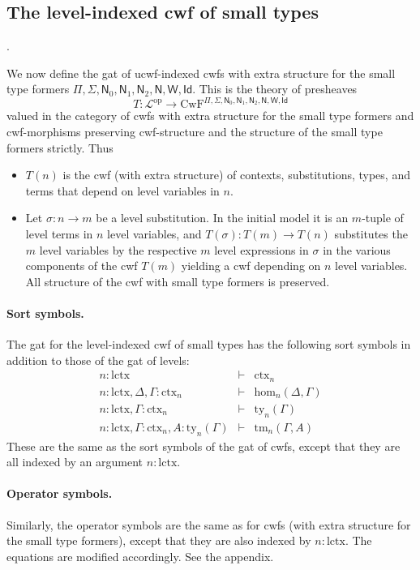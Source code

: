 \documentclass[11pt,a4paper]{article}
\theoremstyle{plain}
\theoremstyle{definition}
\newcommand{\Id}{\mathsf{Id}}
\newcommand{\N}{\mathsf{N}}
\def\sub{\mathrm{hom}}
\def\lctx{\mathrm{lctx}}
\newcommand{\ctx}{\mathrm{ctx}}
\newcommand{\ty}{\mathrm{ty}}
\newcommand{\tm}{\mathrm{tm}}
\def\L{{\mathcal{L}}}
\def\CwF{\mathrm{CwF}}
\def\W{\mathsf{W}}
\begin{document}


\subsection{The level-indexed cwf of small types}\label{lcwf-sort}.

We now define the gat of ucwf-indexed cwfs with extra structure for the small type formers $\Pi,\Sigma,\N_0,\N_1,\N_2,\N,\W,\Id$. This is the theory of presheaves
$$
T : \L^\mathrm{op} \to \CwF^{\Pi,\Sigma,\N_0,\N_1,\N_2,\N,\W,\Id}
$$
valued in the category of cwfs with extra structure for the small type formers and cwf-morphisms preserving cwf-structure and the structure of the small type formers strictly. Thus
\begin{itemize}
\item
$T(n)$ is the cwf (with extra structure) of contexts, substitutions, types, and terms that depend on level variables in $n$.
\item
Let $\sigma : n \to m$ be a level substitution. In the initial model it is an $m$-tuple of level terms in $n$ level variables, and
$T(\sigma) : T(m) \to T(n)$ substitutes the $m$ level variables by the respective $m$ level expressions in $\sigma$ in the various components of the cwf $T(m)$ yielding a cwf depending on $n$ level variables. All structure of the cwf with small type formers is preserved.
\end{itemize}

\paragraph{Sort symbols.} The gat for the level-indexed cwf of small types has the following sort symbols in addition to those of the gat of levels:
\begin{eqnarray*}
n : \lctx &\vdash& \ctx_n\\
n : \lctx, \Delta, \Gamma : \ctx_n &\vdash& \sub_n(\Delta,\Gamma)\\
n : \lctx, \Gamma : \ctx_n &\vdash& \ty_n(\Gamma)\\
n : \lctx, \Gamma : \ctx_n, A:\ty_n(\Gamma) &\vdash& \tm_n(\Gamma,A)
\end{eqnarray*}
These are the same as the sort symbols of the gat of cwfs, except that they are all indexed by an argument $n : \lctx$.

\paragraph{Operator symbols.} Similarly, the operator symbols are the same as for cwfs (with extra structure for the small type formers), except that they are also indexed by $n : \lctx$. The equations are modified accordingly. See the appendix.
\end{document}
